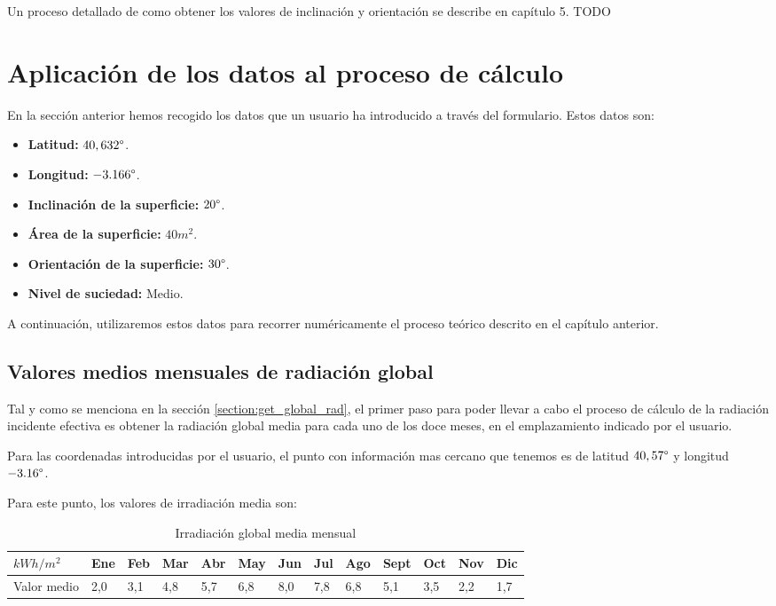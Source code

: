 Un proceso detallado de como obtener los valores de inclinación y orientación se describe en capítulo 5. TODO

\section {Aplicación de los datos al proceso de cálculo}

En la sección anterior hemos recogido los datos que un usuario ha introducido a través del formulario. Estos datos son:
\begin{itemize}
\item \textbf{Latitud:} $40,632 \degree$.
\item \textbf{Longitud:} $-3.166 \degree$.
\item \textbf{Inclinación de la superficie:} $20 \degree$.
\item \textbf{Área de la superficie:} $40 m^2 $.
\item \textbf{Orientación de la superficie:} $30 \degree$.
\item \textbf{Nivel de suciedad:} Medio.
\end{itemize}

A continuación, utilizaremos estos datos para recorrer numéricamente el proceso teórico descrito en el capítulo anterior. 

\subsection{Valores medios mensuales de radiación global}

Tal y como se menciona en la sección \ref{section:get_global_rad}, el primer paso para poder llevar a cabo el proceso de cálculo de la radiación incidente efectiva es obtener la radiación global media para cada uno de los doce meses, en el emplazamiento indicado por el usuario.

Para las coordenadas introducidas por el usuario, el punto con información mas cercano que tenemos es de latitud  $40,57 \degree$ y longitud $-3.16 \degree$. 

Para este punto, los valores de irradiación media son:
\begin{table}[ht]
\centering
\begin{tabular}{|l|l|l|l|l|l|l|l|l|l|l|l|l|}
\hline
$kWh/m^2$   & Ene & Feb & Mar & Abr & May & Jun & Jul & Ago & Sept & Oct & Nov & Dic \\ \hline
Valor medio & 2,0 & 3,1 & 4,8 & 5,7 & 6,8 & 8,0 & 7,8 & 6,8 & 5,1  & 3,5 & 2,2 & 1,7 \\ \hline
\end{tabular}
\label{tab:mean_values_monthly}
\caption{Irradiación global media mensual}
\end{table}

